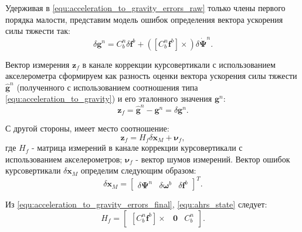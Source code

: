 \documentclass[14pt]{article}
\begin{document}
Удерживая в \eqref{equ:acceleration_to_gravity_errors_raw} только члены первого порядка малости, представим модель ошибок определения  вектора ускорения силы тяжести  так: 
\begin{equation}\label{equ:acceleration_to_gravity_errors_final}
\delta \boldsymbol g^n = C_b^n \delta\boldsymbol f^b + \left(\left[C_b^n \boldsymbol f^b\right]\times\right)  \delta\dot{\boldsymbol\Psi}^n.
\end{equation}

Вектор измерения $\boldsymbol z_{f}$ в канале коррекции курсовертикали с использованием акселерометра сформируем как разность оценки вектора ускорения силы тяжести $\hat{\boldsymbol g}^n$ (полученного с использованием соотношения типа \eqref{equ:acceleration_to_gravity}) и его эталонного значения ${\boldsymbol g}^n$:
\begin{equation}\label{equ:ahrs_measurements_start}
\boldsymbol z_f = \hat{\boldsymbol g}^n - {\boldsymbol g}^n = \delta \boldsymbol g^n. 
\end{equation}

С другой стороны, имеет место соотношение:
\begin{equation}
\boldsymbol z_f = H_f \delta \boldsymbol x_{M} + \boldsymbol\nu_f,
\end{equation}
где $H_f$ - матрица измерений в канале коррекции курсовертикали с использованием акселерометров; $\boldsymbol\nu_f$ - вектор шумов измерений.
Вектор ошибок курсовертикали $\delta \boldsymbol x_M$ определим следующим образом:
\begin{equation}\label{equ:ahrs_state}
\delta \boldsymbol x_M = \begin{bmatrix}\delta{\boldsymbol\Psi}^n & \delta\boldsymbol\omega^b  & \delta\boldsymbol f^b\end{bmatrix}^T.
\end{equation}

Из \eqref{equ:acceleration_to_gravity_errors_final}, \eqref{equ:ahrs_state} следует:
\begin{equation}
H_f = \begin{bmatrix}\left[C_b^n \boldsymbol f^b\right]\times & \boldsymbol 0 & C_b^n\end{bmatrix}.
\end{equation}
 
\end{document}

